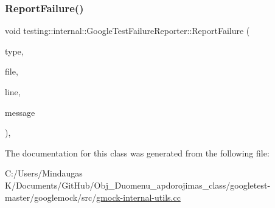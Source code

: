 \mbox{\label{classtesting_1_1internal_1_1_google_test_failure_reporter_aff7bfa8521e770d718172c99c807ec39}} 
\subsubsection{\texorpdfstring{ReportFailure()}{ReportFailure()}\hspace{0.1cm}{\footnotesize\ttfamily [3/3]}}
{\footnotesize\ttfamily void testing\+::internal\+::\+Google\+Test\+Failure\+Reporter\+::\+Report\+Failure (\begin{DoxyParamCaption}\item[{\mbox{\hyperlink{googletest-master_2googletest_2test_2gtest__environment__test_8cc_aa43ad7e2c1c5c5150ba8d95607a96263}{Failure\+Type}}}]{type,  }\item[{const char $\ast$}]{file,  }\item[{int}]{line,  }\item[{const std\+::string \&}]{message }\end{DoxyParamCaption})\hspace{0.3cm}{\ttfamily [inline]}, {\ttfamily [override]}}



The documentation for this class was generated from the following file\+:\begin{DoxyCompactItemize}
\item 
C\+:/\+Users/\+Mindaugas K/\+Documents/\+Git\+Hub/\+Obj\+\_\+\+Duomenu\+\_\+apdorojimas\+\_\+class/googletest-\/master/googlemock/src/\mbox{\hyperlink{googletest-master_2googlemock_2src_2gmock-internal-utils_8cc}{gmock-\/internal-\/utils.\+cc}}\end{DoxyCompactItemize}
